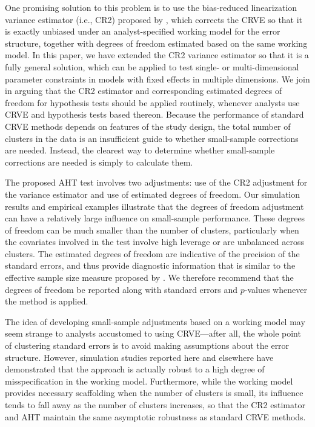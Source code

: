 \documentclass[12pt]{article}\usepackage[]{graphicx}\usepackage[]{color}
\newcommand{\bs}{\boldsymbol}
\begin{document}
One promising solution to this problem is to use the bias-reduced linearization variance estimator (i.e., CR2) proposed by \citet{Bell2002bias}, which corrects the CRVE so that it is exactly unbiased under an analyst-specified working model for the error structure, together with degrees of freedom estimated based on the same working model.
In this paper, we have extended the CR2 variance estimator so that it is a fully general solution, which can be applied to test single- or multi-dimensional parameter constraints in models with fixed effects in multiple dimensions. 
We join \citet{Imbens2015robust} in arguing that the CR2 estimator and corresponding estimated degrees of freedom for hypothesis tests should be applied routinely, whenever analysts use CRVE and hypothesis tests based thereon. 
Because the performance of standard CRVE methods depends on features of the study design, the total number of clusters in the data is an insufficient guide to whether small-sample corrections are needed. 
Instead, the clearest way to determine whether small-sample corrections are needed is simply to calculate them.

The proposed AHT test involves two adjustments: use of the CR2 adjustment for the variance estimator and use of estimated degrees of freedom. 
Our simulation results and empirical examples illustrate that the degrees of freedom adjustment can have a relatively large influence on small-sample performance.
These degrees of freedom can be much smaller than the number of clusters, particularly when the covariates involved in the test involve high leverage or are unbalanced across clusters.
The estimated degrees of freedom are indicative of the precision of the standard errors, and thus provide diagnostic information that is similar to the effective sample size measure proposed by \citet{Carter2013asymptotic}. 
We therefore recommend that the degrees of freedom be reported along with standard errors and $p$-values whenever the method is applied.

The idea of developing small-sample adjustments based on a working model may seem strange to analysts accustomed to using CRVE---after all, the whole point of clustering standard errors is to avoid making assumptions about the error structure.
However, simulation studies reported here and elsewhere  have demonstrated that the approach is actually robust to a high degree of misspecification in the working model. 
Furthermore, while the working model provides necessary scaffolding when the number of clusters is small, its  influence tends to fall away as the number of clusters increases, so that the CR2 estimator and AHT maintain the same asymptotic robustness as standard CRVE methods. 
\end{document}
